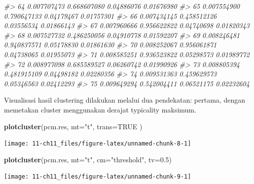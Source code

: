 \documentclass[
  oneside]{book}
\newenvironment{Shaded}{\begin{snugshade}}{\end{snugshade}}
\newcommand{\AttributeTok}[1]{\textcolor[rgb]{0.13,0.29,0.53}{#1}}
\newcommand{\CommentTok}[1]{\textcolor[rgb]{0.56,0.35,0.01}{\textit{#1}}}
\newcommand{\ConstantTok}[1]{\textcolor[rgb]{0.56,0.35,0.01}{#1}}
\newcommand{\DecValTok}[1]{\textcolor[rgb]{0.00,0.00,0.81}{#1}}
\newcommand{\FloatTok}[1]{\textcolor[rgb]{0.00,0.00,0.81}{#1}}
\newcommand{\FunctionTok}[1]{\textcolor[rgb]{0.13,0.29,0.53}{\textbf{#1}}}
\newcommand{\NormalTok}[1]{#1}
\newcommand{\OtherTok}[1]{\textcolor[rgb]{0.56,0.35,0.01}{#1}}
\newcommand{\SpecialCharTok}[1]{\textcolor[rgb]{0.81,0.36,0.00}{\textbf{#1}}}
\newcommand{\StringTok}[1]{\textcolor[rgb]{0.31,0.60,0.02}{#1}}
\begin{document}
\begin{Shaded}
\begin{Highlighting}[]
\CommentTok{\#\textgreater{} 64 0.007707473 0.668607080 0.04886076 0.01676980}
\CommentTok{\#\textgreater{} 65 0.007554900 0.790647133 0.04179467 0.01757301}
\CommentTok{\#\textgreater{} 66 0.007434145 0.458512126 0.03556534 0.01866143}
\CommentTok{\#\textgreater{} 67 0.007960666 0.956622822 0.04740698 0.01820343}
\CommentTok{\#\textgreater{} 68 0.007527732 0.486250056 0.04910778 0.01592207}
\CommentTok{\#\textgreater{} 69 0.008246481 0.940837571 0.05178830 0.01861630}
\CommentTok{\#\textgreater{} 70 0.008252067 0.956061871 0.04738065 0.01955073}
\CommentTok{\#\textgreater{} 71 0.008585251 0.936523822 0.05298573 0.01989772}
\CommentTok{\#\textgreater{} 72 0.008977098 0.685589527 0.06260742 0.01990926}
\CommentTok{\#\textgreater{} 73 0.008805394 0.481915109 0.04498182 0.02280356}
\CommentTok{\#\textgreater{} 74 0.009531363 0.459629573 0.05346563 0.02412293}
\CommentTok{\#\textgreater{} 75 0.009649294 0.542004411 0.06521175 0.02232604}
\end{Highlighting}
\end{Shaded}

Visualisasi hasil clustering dilakukan melalui dua pendekatan: pertama, dengan memetakan cluster menggunakan derajat typicality maksimum.

\begin{Shaded}
\begin{Highlighting}[]
\FunctionTok{plotcluster}\NormalTok{(pcm.res, }\AttributeTok{mt=}\StringTok{"t"}\NormalTok{, }\AttributeTok{trans=}\ConstantTok{TRUE}\NormalTok{ )}
\end{Highlighting}
\end{Shaded}

\begin{center}\texttt{[image: 11-ch11\_files/figure-latex/unnamed-chunk-8-1]} \end{center}

\begin{Shaded}
\begin{Highlighting}[]
\FunctionTok{plotcluster}\NormalTok{(pcm.res, }\AttributeTok{mt=}\StringTok{"t"}\NormalTok{, }\AttributeTok{cm=}\StringTok{"threshold"}\NormalTok{, }\AttributeTok{tv=}\FloatTok{0.5}\NormalTok{)}
\end{Highlighting}
\end{Shaded}

\begin{center}\texttt{[image: 11-ch11\_files/figure-latex/unnamed-chunk-9-1]} \end{center}

\begin{Shaded}
\end{Shaded}
\end{document}
